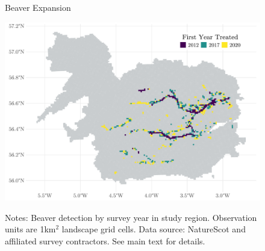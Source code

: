 \begin{figure}
    \centering
    \caption{Beaver Expansion}
    \includegraphics[width=0.7\linewidth]{output/figures/beaver_first_year_treated.pdf}
    \label{fig:beaver-expansion}
    \caption*{\justifying \footnotesize Notes: Beaver detection by survey year in study region. Observation units are 1km$^2$ landscape grid cells. Data source: NatureScot and affiliated survey contractors. See main text for details.}
\end{figure}

